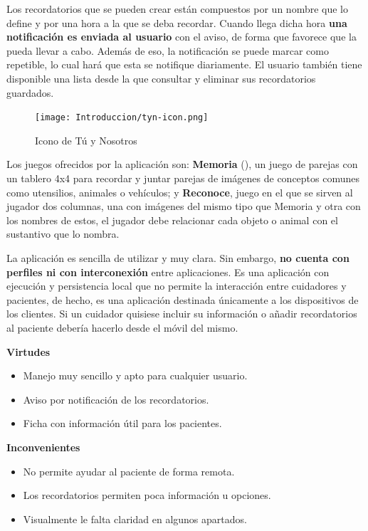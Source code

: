 Los recordatorios que se pueden crear están compuestos por un nombre que lo define y por una hora a la que se deba recordar. Cuando llega dicha hora \textbf{una notificación es enviada al usuario} con el aviso, de forma que favorece que la pueda llevar a cabo. Además de eso, la notificación se puede marcar como repetible, lo cual hará que esta se notifique diariamente. El usuario también tiene disponible una lista desde la que consultar y eliminar sus recordatorios guardados.

\begin{figure}
    \vspace{-20pt}
    \centering
    \texttt{[image: Introduccion/tyn-icon.png]}
    \vspace{-10pt}
    \caption{Icono de Tú y Nosotros}
\end{figure}

Los juegos ofrecidos por la aplicación son: \textbf{Memoria} (), un juego de parejas con un tablero 4x4 para recordar y juntar parejas de imágenes de conceptos comunes como utensilios, animales o vehículos; y \textbf{Reconoce}, juego en el que se sirven al jugador dos columnas, una con imágenes del mismo tipo que Memoria y otra con los nombres de estos, el jugador debe relacionar cada objeto o animal con el sustantivo que lo nombra.

La aplicación es sencilla de utilizar y muy clara. Sin embargo, \textbf{no cuenta con perfiles ni con interconexión} entre aplicaciones. Es una aplicación con ejecución y persistencia local que no permite la interacción entre cuidadores y pacientes, de hecho, es una aplicación destinada únicamente a los dispositivos de los clientes. Si un cuidador quisiese incluir su información o añadir recordatorios al paciente debería hacerlo desde el móvil del mismo.

\textbf{Virtudes}
\begin{itemize}
    \item Manejo muy sencillo y apto para cualquier usuario.
    \item Aviso por notificación de los recordatorios.
    \item Ficha con información útil para los pacientes.
\end{itemize}

\textbf{Inconvenientes}
\begin{itemize}
    \item No permite ayudar al paciente de forma remota.
    \item Los recordatorios permiten poca información u opciones.
    \item Visualmente le falta claridad en algunos apartados.
\end{itemize}


